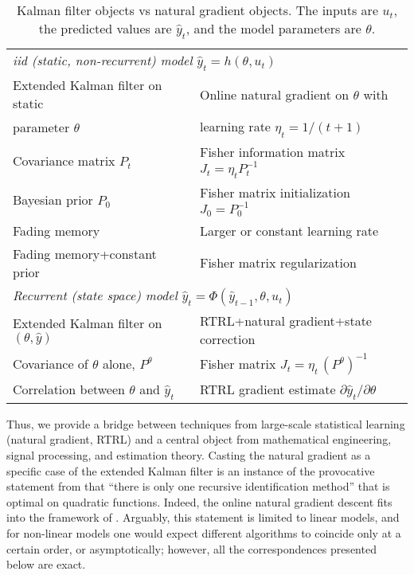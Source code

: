 \documentclass[11pt,a4paper]{article}
\newcommand{\1}{\mathbbm{1}}
\theoremstyle{yannthm}
\theoremstyle{yannthm2}
\newcommand{\Ptheta}{P^\theta}
\numberwithin{equation}{section}
\begin{document}
\begin{table}
\small
\begin{tabular}{ll}
\hline
\multicolumn{2}{l}{\emph{iid (static, non-recurrent) model $\hat y_t=h(\theta,u_t)$}}\\
Extended Kalman filter on static & Online natural
gradient on $\theta$ with\\parameter $\theta$& learning rate $\eta_t=1/(t+1)$
\\
Covariance matrix $P_t$  & Fisher information matrix $J_t=\eta_t
P_t^{-1}$
\\
Bayesian prior $P_0$ & Fisher matrix initialization $J_0=P_0^{-1}$
\\
Fading memory & Larger or constant learning rate
\\
Fading memory+constant prior & Fisher matrix regularization
\\
\hline
\multicolumn{2}{l}{\emph{Recurrent (state space) model $\hat y_t=\Phi(\hat
y_{t-1},\theta,u_t)$}}\\
Extended Kalman filter on $(\theta,\hat y)$ & RTRL+natural gradient+state
correction\\
Covariance of $\theta$ alone, $\Ptheta$ & Fisher matrix $J_t=\eta_t \,(\Ptheta)^{-1}$\\
Correlation between $\theta$ and $\hat y_t$ & RTRL gradient estimate
$\partial \hat y_t/\partial \theta$
\\\hline
\end{tabular}
\caption{Kalman filter objects vs natural gradient objects. The inputs
are $u_t$, the predicted values are $\hat y_t$, and the model parameters
are $\theta$.}
\label{tab:corr}
\end{table}

Thus, we provide a bridge between techniques from large-scale statistical
learning (natural gradient, RTRL) and a central object from mathematical
engineering, signal processing, and estimation theory.  Casting the
natural gradient as a specific case of the extended Kalman filter is an
instance of the provocative statement from \cite{ljung83} that ``there is
only one recursive identification method'' that is optimal on quadratic
functions. Indeed, the online natural gradient descent fits into the
framework of \cite[\S3.4.5]{ljung83}. Arguably, this statement is limited
to linear models, and for non-linear models one would expect different
algorithms to coincide only at a certain order, or asymptotically;
however, all the correspondences presented below are exact.
\end{document}
